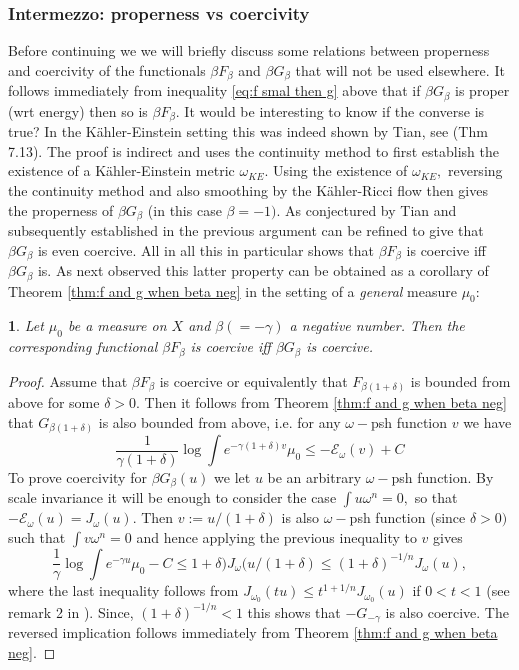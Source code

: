 \documentclass[11pt,oneside,english]{amsart}
\numberwithin{equation}{section}
\numberwithin{figure}{section}
\theoremstyle{plain}
\theoremstyle{plain}
\newtheorem{cor}[thm]{\protect\corollaryname}
\theoremstyle{plain}
\theoremstyle{plain}
\theoremstyle{remark}
\theoremstyle{definition}
\providecommand{\corollaryname}{Corollary}
\begin{document}
\subsubsection{\label{sub:Intermezzo:-properness-vs}Intermezzo: properness vs coercivity}

Before continuing we we will briefly discuss some relations between
properness and coercivity of the functionals $\beta F_{\beta}$ and
$\beta G_{\beta}$ that will not be used elsewhere. It follows immediately
from inequality \ref{eq:f smal then g} above that if $\beta G_{\beta}$
is proper (wrt energy) then so is $\beta F_{\beta}.$ It would be
interesting to know if the converse is true? In the Kähler-Einstein
setting this was indeed shown by Tian, see \cite{ti} (Thm 7.13).
The proof is indirect and uses the continuity method to first establish
the existence of a Kähler-Einstein metric $\omega_{KE}$. Using the
existence of $\omega_{KE},$ reversing the continuity method and also
smoothing by the Kähler-Ricci flow then gives the properness of $\beta G_{\beta}$
(in this case $\beta=-1).$ As conjectured by Tian and subsequently
established in \cite{p-s+} the previous argument can be refined to
give that $\beta G_{\beta}$ is even coercive. All in all this in
particular shows that $\beta F_{\beta}$ is coercive iff $\beta G_{\beta}$
is. As next observed this latter property can be obtained as a corollary
of Theorem \ref{thm:f and g when beta neg} in the setting of a \emph{general}
measure $\mu_{0}:$ 
\begin{cor}
\label{cor:coerc}Let $\mu_{0}$ be a measure on $X$ and $\beta(=-\gamma)$
a negative number. Then the corresponding functional $\beta F_{\beta}$
is coercive iff $\beta G_{\beta}$ is coercive. \end{cor}
\begin{proof}
Assume that $\beta F_{\beta}$ is coercive or equivalently that $F_{\beta(1+\delta)}$
is bounded from above for some $\delta>0.$ Then it follows from Theorem
\ref{thm:f and g when beta neg} that $G_{\beta(1+\delta)}$ is also
bounded from above, i.e. for any $\omega-$psh function $v$ we have
\[
\frac{1}{\gamma(1+\delta)}\log\int e^{-\gamma(1+\delta)v}\mu_{0}\leq-\mathcal{E}_{\omega}(v)+C
\]
 To prove coercivity for $\beta G_{\beta}(u)$ we let $u$ be an arbitrary
$\omega-$psh function. By scale invariance it will be enough to consider
the case $\int u\omega^{n}=0,$ so that $-\mathcal{E}_{\omega}(u)=J_{\omega}(u).$
Then $v:=u/(1+\delta)$ is also $\omega-$psh function (since $\delta>0)$
such that $\int v\omega^{n}=0$ and hence applying the previous inequality
to $v$ gives 
\[
\frac{1}{\gamma}\log\int e^{-\gamma u}\mu_{0}-C\leq1+\delta)J_{\omega}(u/(1+\delta)\leq(1+\delta)^{-1/n}J_{\omega}(u),
\]
 where the last inequality follows from $J_{\omega_{0}}(tu)\leq t^{1+1/n}J_{\omega_{0}}(u)$
if $0<t<1$ (see remark 2 in \cite{din}). Since, $(1+\delta)^{-1/n}<1$
this shows that $-G_{-\gamma}$ is also coercive. The reversed implication
follows immediately from Theorem \ref{thm:f and g when beta neg}. 
\end{proof}
\end{document}
